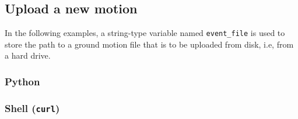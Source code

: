 \hypertarget{upload-a-new-motion}{%
\subsection{Upload a new motion}\label{upload-a-new-motion}}

In the following examples, a string-type variable named \texttt{event\_file}
is used to store the path to a ground motion file that is to be uploaded from disk, i.e, from a hard drive.

\subsubsection{Python}


\subsubsection{Shell (\texttt{curl})}

\begin{Shaded}
\begin{Highlighting}[]
\OperatorTok{=}
\OperatorTok{=}
\OperatorTok{=}
\OperatorTok{=}

   \DataTypeTok{\textbackslash{}}
   \NormalTok{:} \DataTypeTok{\textbackslash{}}
    \DataTypeTok{\textbackslash{}}

 
\end{Highlighting}
\end{Shaded}